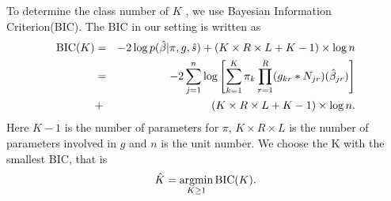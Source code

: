 \documentclass[11pt]{article}
\DeclareMathOperator*{\argmin}{argmin}
\begin{document}
To determine the class number of $K$ , we use Bayesian Information Criterion(BIC). The BIC in our setting is written as 
\begin{eqnarray}
{\rm BIC}(K) &=& -2\log p(\hat\beta|\pi,g,\hat s) + (K\times R\times L+K-1)\times \log n \nonumber \\
&=& -2 \sum_{j=1}^n\log\left[\sum_{k=1}^K\pi_k\prod_{r=1}^R(g_{kr}*N_{jr})(\hat\beta_{jr})\right] \nonumber\\
&+& (K\times R\times L+K-1)\times \log n.
\end{eqnarray}
Here $K-1$ is the number of parameters for $\pi$, $K\times R\times L$ is the number of parameters involved in $g$ and $n$ is the unit number. We choose the K with the smallest BIC, that is 
\begin{equation}
\hat K = \argmin_{K\geq1} {\rm BIC}(K).
\end{equation}
\end{document}
